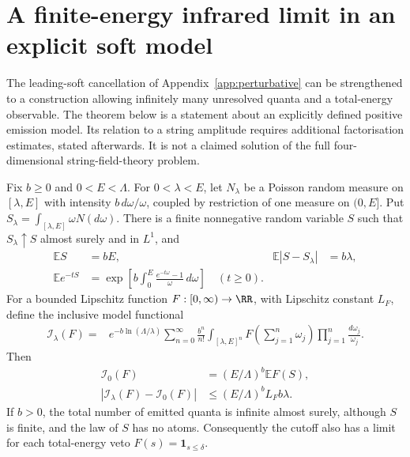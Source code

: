 \section{A finite-energy infrared limit in an explicit soft model}\label{app:infraredlimit}

The leading-soft cancellation of Appendix~\ref{app:perturbative} can be strengthened to a construction allowing infinitely many unresolved quanta and a total-energy observable. The theorem below is a statement about an explicitly defined positive emission model. Its relation to a string amplitude requires additional factorisation estimates, stated afterwards. It is not a claimed solution of the full four-dimensional string-field-theory problem.

\begin{theorem}\label{thm:softmeasure}
Fix $b\ge0$ and $0<E<\Lambda$. For $0<\lambda<E$, let $N_\lambda$ be a Poisson random measure on $[\lambda,E]$ with intensity $b\,d\omega/\omega$, coupled by restriction of one measure on $(0,E]$. Put $S_\lambda=\int_{[\lambda,E]}\omega N(d\omega)$. There is a finite nonnegative random variable $S$ such that $S_\lambda\uparrow S$ almost surely and in $L^1$, and
\begin{align}
\mathbb E S&=bE,&\mathbb E|S-S_\lambda|&=b\lambda,\\
\mathbb E e^{-tS}&=\exp\left[b\int_0^E\frac{e^{-t\omega}-1}{\omega}\,d\omega\right]\quad(t\ge0).
\end{align}
For a bounded Lipschitz function $F:[0,\infty)\to\RR$, with Lipschitz constant $L_F$, define the inclusive model functional
\begin{align}
\mathcal I_\lambda(F)={}&e^{-b\ln(\Lambda/\lambda)}
\sum_{n=0}^{\infty}\frac{b^n}{n!}
\int_{[\lambda,E]^n}F\left(\sum_{j=1}^n\omega_j\right)
\prod_{j=1}^n\frac{d\omega_j}{\omega_j}.
\end{align}
Then
\begin{align}
\mathcal I_0(F)&=(E/\Lambda)^b\mathbb EF(S),\\
|\mathcal I_\lambda(F)-\mathcal I_0(F)|
&\le(E/\Lambda)^b L_F b\lambda.
\end{align}
If $b>0$, the total number of emitted quanta is infinite almost surely, although $S$ is finite, and the law of $S$ has no atoms. Consequently the cutoff also has a limit for each total-energy veto $F(s)=\mathbf1_{s\le\delta}$.
\end{theorem}

